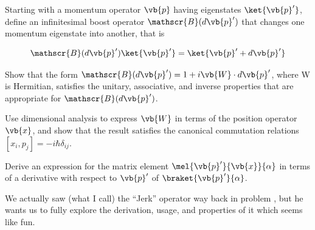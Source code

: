 \begin{question}

  \begin{questionpart}
    Starting with a momentum operator $\vb{p}$ having eigenstates
    $\ket{\vb{p}'}$, define an infinitesimal boost operator
    $\mathscr{B}(d\vb{p}')$ that changes one momentum eigenstate into
    another, that is

    \begin{equation*}
      \mathscr{B}(d\vb{p}')\ket{\vb{p}'} = \ket{\vb{p}' + d\vb{p}'}
    \end{equation*}
  \end{questionpart}

  \begin{questionpart}
    Show that the form $\mathscr{B}(d\vb{p}') = 1 + i\vb{W}\cdot
    d\vb{p}'$, where W is Hermitian, satisfies the unitary,
    associative, and inverse properties that are appropriate for
    $\mathscr{B}(d\vb{p}')$.
  \end{questionpart}

  \begin{questionpart}
    Use dimensional analysis to express $\vb{W}$ in terms of the
    position operator $\vb{x}$, and show that the result satisfies the
    canonical commutation relations $[x_i,p_j] = -i\hbar\delta_{ij}$.
  \end{questionpart}

  \begin{questionpart}
    Derive an expression for the matrix element
    $\mel{\vb{p}'}{\vb{x}}{\alpha}$ in terms of a derivative with
    respect to $\vb{p}'$ of $\braket{\vb{p}'}{\alpha}$.
  \end{questionpart}
\end{question}

\begin{purpose}
  We actually saw (what I call) the ``Jerk'' operator way back in
  problem , but he wants us to fully explore
  the derivation, usage, and properties of it which seems like fun.
\end{purpose}

